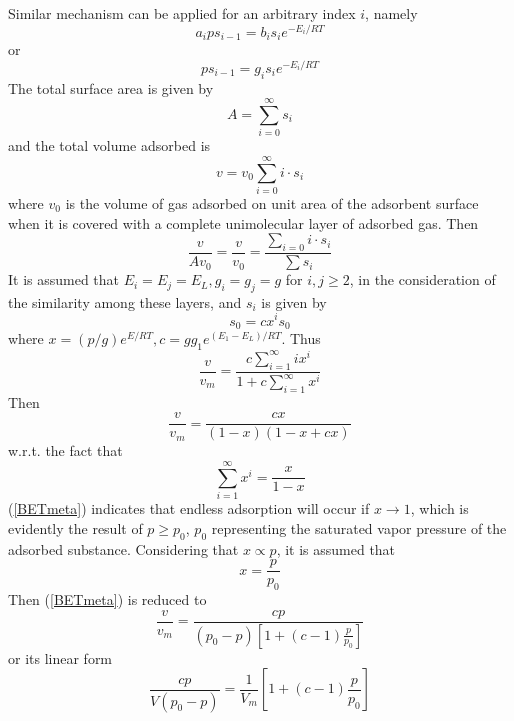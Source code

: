 \documentclass[%
 reprint,
 amsmath,amssymb,
 aps,
10.5pt,
]{revtex4-1}
\begin{document}
Similar mechanism can be applied for an arbitrary index $i$, namely
\begin{equation}
a_i p s_{i-1} = b_i s_i e^{-E_i/RT}
\end{equation}
or
\begin{equation}
p s_{i-1} = g_i s_i e^{-E_i/RT}
\end{equation}
The total surface area is given by
\begin{equation}
A=\sum_{i=0}^{\infty} s_i
\end{equation}
and the total volume adsorbed is 
\begin{equation}
v = v_0 \sum_{i=0}^{\infty} i \cdot s_i
\end{equation}
where $v_0$ is the volume of gas adsorbed on unit area of the adsorbent surface when it is covered with a complete unimolecular layer of adsorbed gas. Then
\begin{equation}
\frac{v}{Av_0} = \frac{v}{v_0} = \frac{\sum_{i=0} i\cdot s_i}{\sum s_i}
\end{equation}
It is assumed that $E_i = E_j =E_L, g_i = g_j = g$ for $i,j \geq 2$, in the consideration of the similarity among these layers, and $s_i$ is given by
\begin{equation}
s_0 = c x^i s_0
\end{equation}
where $x = (p/g) e^{E/RT}, c = g g_1 e^{(E_1-E_L)/RT}$. Thus
\begin{equation}
\frac{v}{v_m} = \frac{c \sum_{i=1}^\infty i x^i}{1+ c \sum_{i=1}^\infty x^i}
\end{equation}
Then
\begin{equation}
\frac{v}{v_m} = \frac{cx}{(1-x)(1-x+cx)}
\label{BETmeta}
\end{equation}
w.r.t. the fact that
\begin{equation}
\sum_{i=1}^{\infty} x^i = \frac{x}{1-x} 
\end{equation}
(\ref{BETmeta}) indicates that endless adsorption will occur if $x \rightarrow 1$, which is evidently the result of $p \geqslant p_0$, $p_0$ representing the saturated vapor pressure of the adsorbed substance. Considering that $x \propto p$, it is assumed that
\begin{equation}
x= \frac{p}{p_0}
\end{equation}
Then (\ref{BETmeta}) is reduced to
\begin{equation}
\frac{v}{v_m} = \frac{c p}{(p_0-p)\left[1+(c-1)\frac{p}{p_0}\right]}
\end{equation}
or its linear form
\begin{equation}
\frac{c p}{V(p_0-p)} = \frac{1}{V_m}\left[1+(c-1)\frac{p}{p_0}\right]
\end{equation}
\end{document}
